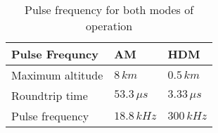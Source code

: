 \begin{table}[H]
\centering
\caption{Pulse frequency for both modes of operation}
\label{tab:f_pulse}
\begin{tabular}{|l|ll|}\hline
    \textbf{Pulse Frequncy} & AM & HDM \\
    \hline 
    Maximum altitude & $8\,km$ & $0.5\,km$ \\
    Roundtrip time & $53.3\,\mu s$ & $3.33\,\mu s$ \\
    Pulse frequency & $18.8\,kHz$ & $300\,kHz$ \\
    \hline 
\end{tabular}
\end{table}
